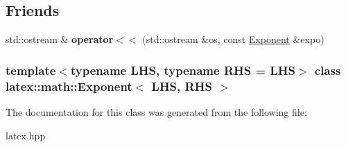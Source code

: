 \subsection*{\-Friends}
\begin{DoxyCompactItemize}
\item 
\hypertarget{classlatex_1_1math_1_1Exponent_a56873f9cc4a3a04da6c90eb781512537}{std\-::ostream \& {\bfseries operator$<$$<$} (std\-::ostream \&os, const \hyperlink{classlatex_1_1math_1_1Exponent}{\-Exponent} \&expo)}\label{classlatex_1_1math_1_1Exponent_a56873f9cc4a3a04da6c90eb781512537}

\end{DoxyCompactItemize}
\subsubsection*{template$<$typename \-L\-H\-S, typename \-R\-H\-S = \-L\-H\-S$>$ class latex\-::math\-::\-Exponent$<$ L\-H\-S, R\-H\-S $>$}



\-The documentation for this class was generated from the following file\-:\begin{DoxyCompactItemize}
\item 
latex.\-hpp\end{DoxyCompactItemize}

